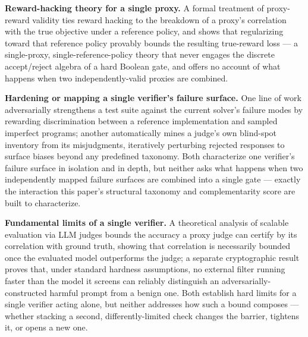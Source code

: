 \documentclass[11pt]{article}
\begin{document}
\textbf{Reward-hacking theory for a single proxy.} A formal treatment of proxy-reward validity \citep{correlatedproxies2403} ties reward hacking to the breakdown of a proxy's correlation with the true objective under a reference policy, and shows that regularizing toward that reference policy provably bounds the resulting true-reward loss --- a single-proxy, single-reference-policy theory that never engages the discrete accept/reject algebra of a hard Boolean gate, and offers no account of what happens when two independently-valid proxies are combined.

\textbf{Hardening or mapping a single verifier's failure surface.} One line of work \citep{utrl2508} adversarially strengthens a test suite against the current solver's failure modes by rewarding discrimination between a reference implementation and sampled imperfect programs; another \citep{biasscope2602} automatically mines a judge's own blind-spot inventory from its misjudgments, iteratively perturbing rejected responses to surface biases beyond any predefined taxonomy. Both characterize one verifier's failure surface in isolation and in depth, but neither asks what happens when two independently mapped failure surfaces are combined into a single gate --- exactly the interaction this paper's structural taxonomy and complementarity score are built to characterize.

\textbf{Fundamental limits of a single verifier.} A theoretical analysis of scalable evaluation via LLM judges \citep{judgelimits2410} bounds the accuracy a proxy judge can certify by its correlation with ground truth, showing that correlation is necessarily bounded once the evaluated model outperforms the judge; a separate cryptographic result \citep{filterbarriers2507} proves that, under standard hardness assumptions, no external filter running faster than the model it screens can reliably distinguish an adversarially-constructed harmful prompt from a benign one. Both establish hard limits for a single verifier acting alone, but neither addresses how such a bound composes --- whether stacking a second, differently-limited check changes the barrier, tightens it, or opens a new one.
\end{document}
